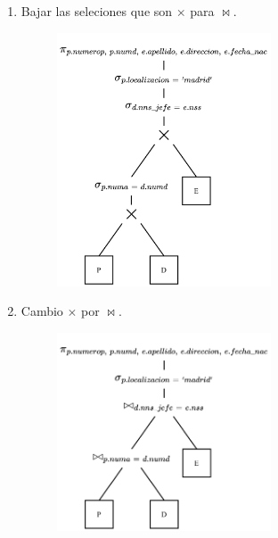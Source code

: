 \documentclass{templateNote}
\begin{document}
\begin{enumerate}
\begin{itemize}
\begin{enumerate}
            \item Bajar las seleciones que son $\times$ para $\Join$.
            \begin{figure}[H]
                \centering
                \includegraphics[width=0.6\textwidth]{img/E4-Paso-3.png}
            \end{figure}

            \item Cambio $\times$ por $\Join$.
            \begin{figure}[H]
                \centering
                \includegraphics[width=0.6\textwidth]{img/E4-Paso-4.png}
            \end{figure}


\end{enumerate}
\end{itemize}
\end{enumerate}
\end{document}
